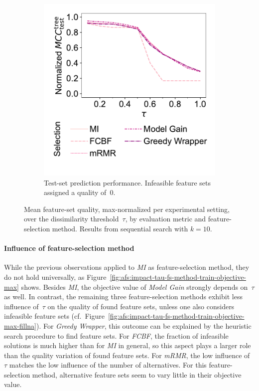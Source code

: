 \documentclass{article}
\theoremstyle{definition}
\begin{document}
\begin{figure}[htbp]
\begin{subfigure}[t]{0.48\textwidth}
		\includegraphics[width=\textwidth, trim=20 40 15 15, clip]{plots/afs-impact-tau-fs-method-decision-tree-test-mcc-max-fillna.pdf}
		\caption{
			Test-set prediction performance.
			Infeasible feature sets assigned a quality of~0.
		}
		\label{fig:afs:impact-tau-fs-method-decision-tree-test-mcc-max-fillna}
	\end{subfigure}
	\caption{
		Mean feature-set quality, max-normalized per experimental setting, over the dissimilarity threshold~$\tau$, by evaluation metric and feature-selection method.
		Results from sequential search with $k=10$.
	}
	\label{fig:afs:impact-tau-fs-method-quality}
\end{figure}

\paragraph{Influence of feature-selection method}

While the previous observations applied to \emph{MI} as feature-selection method, they do not hold universally, as Figure~\ref{fig:afs:impact-tau-fs-method-train-objective-max} shows.
Besides \emph{MI}, the objective value of \emph{Model Gain} strongly depends on~$\tau$ as well.
In contrast, the remaining three feature-selection methods exhibit less influence of~$\tau$ on the quality of found feature sets, unless one also considers infeasible feature sets (cf.~Figure~\ref{fig:afs:impact-tau-fs-method-train-objective-max-fillna}).
For \emph{Greedy Wrapper}, this outcome can be explained by the heuristic search procedure to find feature sets.
For \emph{FCBF}, the fraction of infeasible solutions is much higher than for \emph{MI} in general, so this aspect plays a larger role than the quality variation of found feature sets.
For \emph{mRMR}, the low influence of~$\tau$ matches the low influence of the number of alternatives.
For this feature-selection method, alternative feature sets seem to vary little in their objective value.
\end{document}
